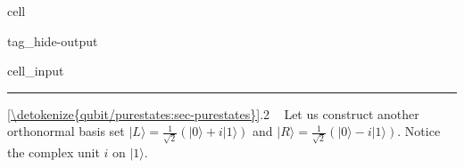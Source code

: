 \documentclass[letterpaper,10pt,english]{jupyterBook}
\begin{document}
\begin{sphinxuseclass}{cell}
\begin{sphinxuseclass}{tag_hide-output}
\begin{sphinxVerbatimInput}
\begin{sphinxuseclass}{cell_input}
\begin{sphinxVerbatim}[commandchars=\\\{\}]
 
\end{sphinxVerbatim}

\end{sphinxuseclass}\end{sphinxVerbatimInput}

\end{sphinxuseclass}
\end{sphinxuseclass}

\bigskip\hrule\bigskip


\sphinxAtStartPar
{} \hyperref[\detokenize{qubit/purestates:sec-purestates}]{\ref{\detokenize{qubit/purestates:sec-purestates}}}.2    Let us construct another orthonormal basis set \(|L\rangle = \frac{1}{\sqrt{2}}\left(|0\rangle + i |1\rangle\right)\) and \(|R\rangle = \frac{1}{\sqrt{2}}\left(|0\rangle - i |1\rangle\right)\).  Notice the complex unit \(i\) on \(|1\rangle\).
\end{document}
